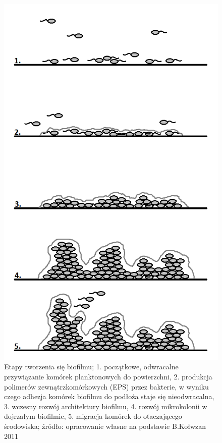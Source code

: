 \documentclass[11pt,a4paper]{report}
\begin{document}
\clearpage
\begin{figure}[!h]

\begin{center}
\includegraphics[scale=0.68]{img/biofilm.png}
\caption{Etapy tworzenia się biofilmu;
1. początkowe, odwracalne przywiązanie komórek planktonowych do powierzchni,
2. produkcja polimerów zewnątrzkomórkowych (EPS) przez bakterie, w wyniku czego adhezja komórek biofilmu do podłoża staje się nieodwracalna,
3. wczesny rozwój architektury biofilmu,
4. rozwój mikrokolonii w dojrzałym biofilmie, 
5. migracja komórek do otaczającego środowiska;
źródło: opracowanie własne na podstawie B.Kołwzan 2011\cite{kolwzan}}\label{biofilm}
\end{center} 
\end{figure}
\clearpage
\end{document}

